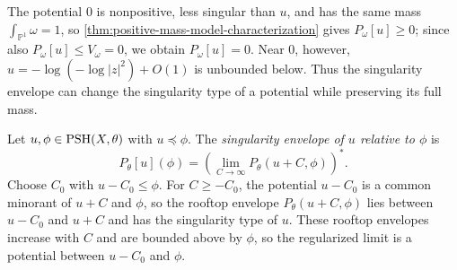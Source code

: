 \begin{example}
The potential $0$ is nonpositive, less singular than $u$, and has the same mass $\int_{\mathbb P^1}\omega=1$, so \cref{thm:positive-mass-model-characterization} gives $P_\omega[u]\geq0$; since also $P_\omega[u]\leq V_\omega=0$, we obtain $P_\omega[u]=0$. Near $0$, however, $u=-\log(-\log|z|^2)+O(1)$ is unbounded below. Thus the singularity envelope can change the singularity type of a potential while preserving its full mass.
\end{example}

\begin{definition}\label{def:relative-singularity-envelope}
Let $u,\phi\in\mathrm{PSH}(X,\theta)$ with $u\preceq\phi$. The \emph{singularity envelope of $u$ relative to $\phi$} is
\[
 P_\theta[u](\phi)
       =\left(\lim_{C\to\infty}P_\theta(u+C,\phi)\right)^*.
\]
Choose $C_0$ with $u-C_0\leq\phi$. For $C\geq-C_0$, the potential $u-C_0$ is a common minorant of $u+C$ and $\phi$, so the rooftop envelope $P_\theta(u+C,\phi)$ lies between $u-C_0$ and $u+C$ and has the singularity type of $u$. These rooftop envelopes increase with $C$ and are bounded above by $\phi$, so the regularized limit is a potential between $u-C_0$ and $\phi$.
\end{definition}

